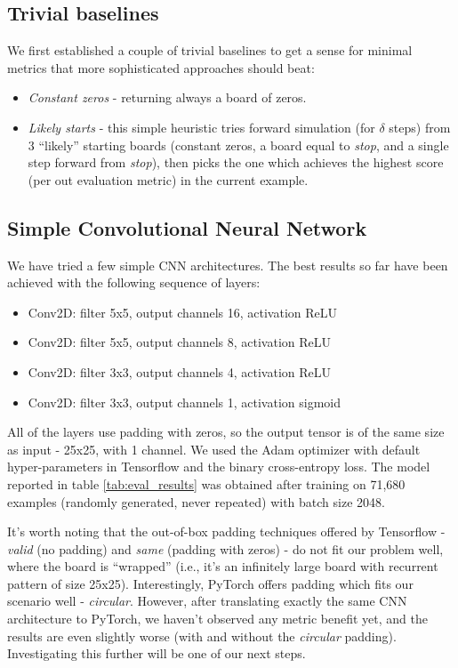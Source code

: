 \documentclass[conference]{IEEEtran}
\begin{document}
\subsection{Trivial baselines}
We first established a couple of trivial baselines to get a sense for minimal metrics that more sophisticated approaches should beat:
\begin{itemize}
    \item {\it Constant zeros} - returning always a board of zeros.
    \item {\it Likely starts} - this simple heuristic tries forward simulation (for $\delta$ steps) from $3$ ``likely'' starting boards (constant zeros, a board equal to {\it stop}, and a single step forward from {\it stop}), then picks the one which achieves the highest score (per out evaluation metric) in the current example.
\end{itemize}

\subsection{Simple Convolutional Neural Network}

We have tried a few simple CNN architectures. The best results so far have been achieved with the following sequence of layers:

\begin{itemize}
    \item Conv2D: filter 5x5, output channels 16, activation ReLU
    \item Conv2D: filter 5x5, output channels 8, activation ReLU
    \item Conv2D: filter 3x3, output channels 4, activation ReLU
    \item Conv2D: filter 3x3, output channels 1, activation sigmoid
\end{itemize}

All of the layers use padding with zeros, so the output tensor is of the same size as input - 25x25, with 1 channel. We used the Adam optimizer with default hyper-parameters in Tensorflow and the binary cross-entropy loss. The model reported in table \ref{tab:eval_results} was obtained after training on 71,680 examples (randomly generated, never repeated) with batch size 2048.

It's worth noting that the out-of-box padding techniques offered by Tensorflow - {\it valid} (no padding) and {\it same} (padding with zeros) - do not fit our problem well, where the board is ``wrapped'' (i.e., it's an infinitely large board with recurrent pattern of size 25x25). Interestingly, PyTorch offers padding which fits our scenario well - {\it circular}. However, after translating exactly the same CNN architecture to PyTorch, we haven't observed any metric benefit yet, and the results are even slightly worse (with and without the {\it circular} padding). Investigating this further will be one of our next steps.
\end{document}
